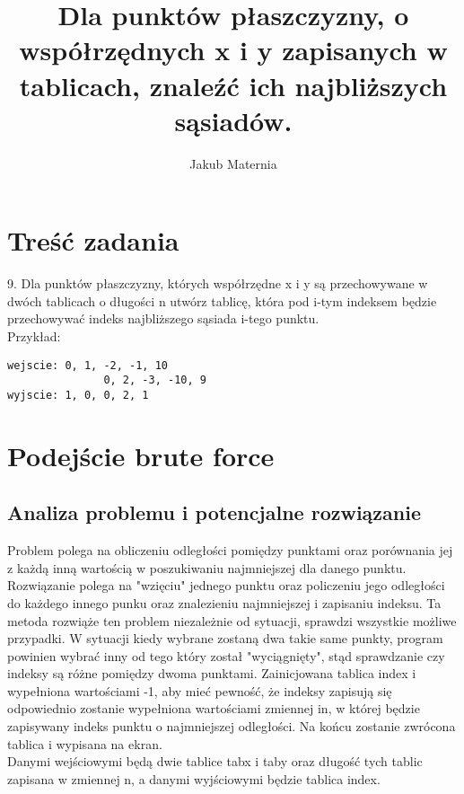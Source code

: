 \documentclass[12pt,twoside]{article}
\author{Jakub Maternia}
\title{Dla punktów płaszczyzny, o współrzędnych x i y zapisanych w tablicach, znaleźć ich najbliższych sąsiadów.}
\begin{document}
\maketitle

\clearpage

\tableofcontents

\clearpage

\section{Treść zadania}

9. Dla punktów płaszczyzny, których współrzędne x i y są przechowywane w dwóch tablicach o długości n utwórz tablicę, która pod i-tym indeksem będzie przechowywać indeks najbliższego sąsiada i-tego punktu.
\\ Przykład:
\begin{lstlisting}[caption=Przykład,label={Przyklad}]
wejscie: 0, 1, -2, -1, 10 
		 	   0, 2, -3, -10, 9
wyjscie: 1, 0, 0, 2, 1
  \end{lstlisting}


\section{Podejście brute force}
\subsection{Analiza problemu i potencjalne rozwiązanie}
Problem polega na obliczeniu odległości pomiędzy punktami oraz porównania jej z każdą inną wartością w poszukiwaniu najmniejszej dla danego punktu.
Rozwiązanie polega na "wzięciu" jednego punktu oraz policzeniu jego odległości do każdego innego punku oraz znalezieniu najmniejszej i zapisaniu indeksu.
Ta metoda rozwiąże ten problem niezależnie od sytuacji, sprawdzi wszystkie możliwe przypadki.
W sytuacji kiedy wybrane zostaną dwa takie same punkty, program powinien wybrać inny od tego który został "wyciągnięty", stąd sprawdzanie czy indeksy są różne pomiędzy dwoma punktami.
Zainicjowana tablica index i wypełniona wartościami -1, aby mieć pewność, że indeksy zapisują się odpowiednio zostanie wypełniona wartościami zmiennej in, w której będzie zapisywany indeks punktu o najmniejszej odległości.
Na końcu zostanie zwrócona tablica i wypisana na ekran.\\
Danymi wejściowymi będą dwie tablice tabx i taby oraz długość tych tablic zapisana w zmiennej n, a danymi wyjściowymi będzie tablica index.
\clearpage
\end{document}

